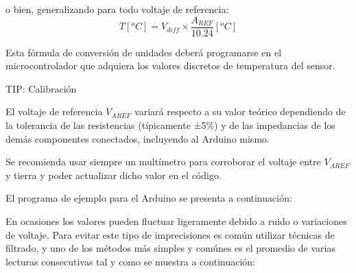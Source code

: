 \noindent o bien, generalizando para todo voltaje de referencia:
\begin{equation*}
	T[^{o}C] = V_{diff} \times \frac{A_{REF}}{ 10.24 }[^{o}C]
\end{equation*}

Esta fórmula de conversión de unidades deberá programarse en el microcontrolador que adquiera los valores discretos de temperatura del sensor.

\medskip
\begin{greenbox}{\large TIP: Calibración}
	\begin{center}
		El voltaje de referencia $V_{AREF}$ variará respecto a su valor teórico dependiendo de la tolerancia de las resistencias (típicamente ±5\%) y de las impedancias de los demás componentes conectados, incluyendo al Arduino mismo.

		\smallskip

		Se recomienda usar siempre un multímetro para corroborar el voltaje entre $V_{AREF}$ y tierra y poder actualizar dicho valor en el código.\footnotemark{}
	\end{center}
\end{greenbox}
\medskip

El programa de ejemplo para el Arduino\footnotemark{} se presenta a continuación:

\begin{minipage}{\linewidth}

\end{minipage}


En ocasiones los valores pueden fluctuar ligeramente debido a ruido o variaciones de voltaje.
Para evitar este tipo de imprecisiones es común utilizar técnicas de filtrado, y uno de los métodos más simples y comúnes es el promedio de varias lecturas consecutivas tal y como se muestra a continuación:

\begin{minipage}{\linewidth}

\end{minipage}

